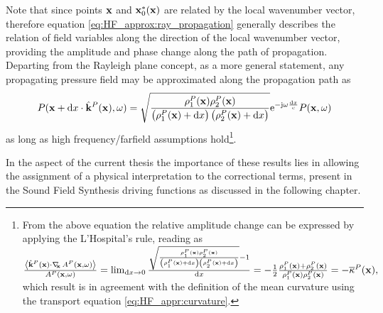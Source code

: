 Note that since points $\mathbf{x}$ and $\mathbf{x}_0^*(\mathbf{x})$ are related by the local wavenumber vector, therefore equation \eqref{eq:HF_approx:ray_propagation} generally describes the relation of field variables along the direction of the local wavenumber vector, providing the amplitude and phase change along the path of propagation.
Departing from the Rayleigh plane concept, as a more general statement, any propagating pressure field may be approximated along the propagation path as
\begin{equation}
\small
P(\mathbf{x}+\mathrm{d} x \cdot \hat{\mathbf{k}}^P(\mathbf{x}),\omega) =
\sqrt{ \frac{ \rho_1^P(\mathbf{x}) \rho_2^P(\mathbf{x}) }{ \left(\rho_1^P(\mathbf{x}) + \mathrm{d} x \right) \left(\rho_2^P(\mathbf{x}) + \mathrm{d} x\right) } }
\mathrm{e}^{-\mathrm{j} \omega \frac{\mathrm{d} x}{c} } P(\mathbf{x},\omega)
\end{equation}
as long as high frequency/farfield assumptions hold\footnote{From the above equation the relative amplitude change can be expressed by applying the L'Hospital's rule, reading as
$\small
\frac{\left< \hat{\mathbf{k}}^P(\mathbf{x}) \cdot \nabla_{\!\!\mathbf{x}}\, A^P(\mathbf{x},\omega) \right>}{A^P(\mathbf{x},\omega)} = \lim_{\mathrm{d} x \rightarrow 0} 
\frac{\sqrt{ \frac{ \rho_1^P(\mathbf{x}) \rho_2^P(\mathbf{x}) }{ \left(\rho_1^P(\mathbf{x}) + \mathrm{d} x \right) \left(\rho_2^P(\mathbf{x}) + \mathrm{d} x\right) } }-1}{\mathrm{d} x}
= 
-\frac{1}{2}\frac{\rho_1^P(\mathbf{x}) + \rho_2^P(\mathbf{x})}{\rho_1^P(\mathbf{x}) \rho_2^P(\mathbf{x})} = -\overline{\kappa}^P(\mathbf{x}),
$%
which result is in agreement with the definition of the mean curvature using the transport equation \eqref{eq:HF_appr:curvature}.}.

In the aspect of the current thesis the importance of these results lies in allowing the assignment of a physical interpretation to the correctional terms, present in the Sound Field Synthesis driving functions as discussed in the following chapter.

